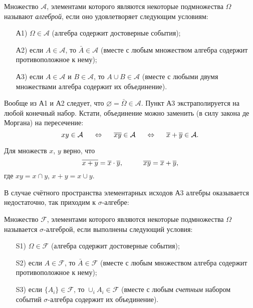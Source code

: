 \begin{to_def}
    Множество $\mathcal A$, элементами которого являются некоторые подмножества $\Omega$ называют \textit{алгеброй}, если оно удовлетворяет следующим условиям:
    \begin{itemize}
        \item[А1)] $\Omega \in \mathcal A$ 
        (алгебра содержит достоверные события);
        \item[А2)] если $A \in \mathcal A$, то $\bar{A} \in \mathcal A$ 
        (вместе с любым множеством алгебра содержит противоположное к нему);
        \item[А3)] если $A \in \mathcal A$ и $B \in \mathcal A$, то $A \cup B \in \mathcal A$ 
        (вместе с любыми двумя множествами алгебра содержит их объединение).
    \end{itemize}
\end{to_def}


Вообще из А1 и А2 следует, что $\varnothing = \bar{\Omega} \in \mathcal A$. Пункт А3 экстраполируется на любой конечный набор. Кстати, объединение можно заменить (в силу закона де Моргана) на пересечение:
\begin{equation*}
    xy \in \mathcal A
    \hspace{0.5cm} \Leftrightarrow \hspace{0.5cm}
    \overline{xy} \in \mathcal A
    \hspace{0.5cm} \Leftrightarrow \hspace{0.5cm}
    \overline{x} + \overline{y} \in \mathcal A.
\end{equation*}

\begin{to_thr}
    Для множеств $x$, $y$ верно, что
    \begin{equation*}
        \overline{x + y} = \overline{x} \cdot \overline{y},
        \hspace{1 cm}
        \overline{xy} = \overline{x} + \overline{y},
    \end{equation*}
    где $xy = x \cap y$, $x + y = x \cup y$. 
\end{to_thr}

В случае счётного пространства элементарных исходов А3 алгебры оказывается недостаточно, так приходим к $\sigma$-алгебре:
\begin{to_def}
    Множество $\mathcal F$, элементами которого являются некоторые подмножества $\Omega$ называется $\sigma$-алгеброй, если выполнены следующий условия:
    \begin{itemize}
        \item[S1)] $\Omega \in \mathcal F$ 
        (алгебра содержит достоверные события);
        \item[S2)] если $A \in \mathcal F$, то $\bar{A} \in \mathcal F$ 
        (вместе с любым множеством алгебра содержит противоположное к нему);
        \item[S3)] если $\{A_i\} \in \mathcal F$, то $\cup_i A_i \in \mathcal F$  
        (вместе с любым \textit{счетным} набором событий $\sigma$-алгебра содержит их объединение).
    \end{itemize}
\end{to_def}

